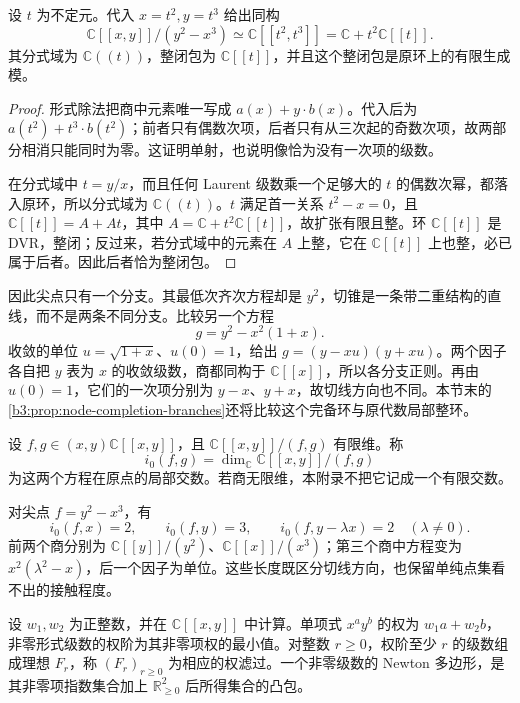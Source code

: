 \begin{proposition}\label{b3:prop:formal-cusp-normalization}
	设 \(t\) 为不定元。代入 \(x=t^2,y=t^3\) 给出同构
	\[
		\mathbb C[\![x,y]\!]/(y^2-x^3) \simeq \mathbb C[\![t^2,t^3]\!] =\mathbb C+t^2\mathbb C[\![t]\!].
	\]
	其分式域为 \(\mathbb C(\!(t)\!)\)，整闭包为 \(\mathbb C[\![t]\!]\)，并且这个整闭包是原环上的有限生成模。
\end{proposition}
\begin{proof}
	形式除法把商中元素唯一写成 \(a(x)+y\cdot b(x)\)。代入后为 \(a(t^2)+t^3\cdot b(t^2)\)；前者只有偶数次项，后者只有从三次起的奇数次项，故两部分相消只能同时为零。这证明单射，也说明像恰为没有一次项的级数。

	在分式域中 \(t=y/x\)，而且任何 Laurent 级数乘一个足够大的 \(t\) 的偶数次幂，都落入原环，所以分式域为 \(\mathbb C(\!(t)\!)\)。\(t\) 满足首一关系 \(t^2-x=0\)，且 \(\mathbb C[\![t]\!]=A+At\)，其中 \(A=\mathbb C+t^2\mathbb C[\![t]\!]\)，故扩张有限且整。环 \(\mathbb C[\![t]\!]\) 是 DVR，整闭；反过来，若分式域中的元素在 \(A\) 上整，它在 \(\mathbb C[\![t]\!]\) 上也整，必已属于后者。因此后者恰为整闭包。
\end{proof}

因此尖点只有一个分支。其最低次齐次方程却是 \(y^2\)，切锥是一条带二重结构的直线，而不是两条不同分支。比较另一个方程
\[
	g=y^2-x^2(1+x).
\]
收敛的单位 \(u=\sqrt{1+x}\)、\(u(0)=1\)，给出 \(g=(y-xu)(y+xu)\)。两个因子各自把 \(y\) 表为 \(x\) 的收敛级数，商都同构于 \(\mathbb C[\![x]\!]\)，所以各分支正则。再由 \(u(0)=1\)，它们的一次项分别为 \(y-x\)、\(y+x\)，故切线方向也不同。本节末的\cref{b3:prop:node-completion-branches}还将比较这个完备环与原代数局部整环。

\begin{definition}\label{b3:def:plane-local-intersection-number}
	设 \(f,g\in(x,y)\mathbb C[\![x,y]\!]\)，且 \(\mathbb C[\![x,y]\!]/(f,g)\) 有限维。称
	\[
		i_0(f,g)=\dim_{\mathbb C}\mathbb C[\![x,y]\!]/(f,g)
	\]
	为这两个方程在原点的局部交数。若商无限维，本附录不把它记成一个有限交数。
\end{definition}

对尖点 \(f=y^2-x^3\)，有
\[
	i_0(f,x)=2,\qquad i_0(f,y)=3,\qquad i_0(f,y-\lambda x)=2\quad(\lambda\ne0).
\]
前两个商分别为 \(\mathbb C[\![y]\!]/(y^2)\)、\(\mathbb C[\![x]\!]/(x^3)\)；第三个商中方程变为 \(x^2(\lambda^2-x)\)，后一个因子为单位。这些长度既区分切线方向，也保留单纯点集看不出的接触程度。

\begin{definition}\label{b3:def:weighted-newton-filtration}
	设 \(w_1,w_2\) 为正整数，并在 \(\mathbb C[\![x,y]\!]\) 中计算。单项式 \(x^ay^b\) 的权为 \(w_1a+w_2b\)，非零形式级数的权阶为其非零项权的最小值。对整数 \(r\ge0\)，权阶至少 \(r\) 的级数组成理想 \(F_r\)，称 \((F_r)_{r\ge0}\) 为相应的权滤过。一个非零级数的 Newton 多边形，是其非零项指数集合加上 \(\mathbb R_{\ge0}^2\) 后所得集合的凸包。
\end{definition}


